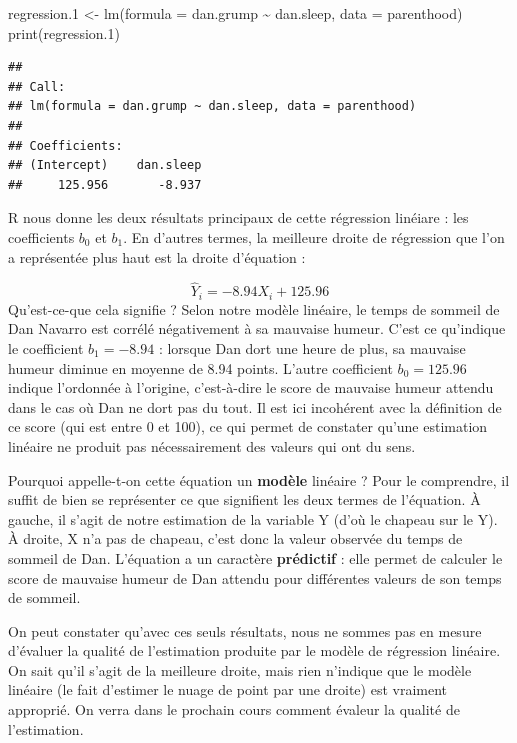 \documentclass[
  french,
]{book}
\newenvironment{Shaded}{\begin{snugshade}}{\end{snugshade}}
\newcommand{\AttributeTok}[1]{\textcolor[rgb]{0.77,0.63,0.00}{#1}}
\newcommand{\FloatTok}[1]{\textcolor[rgb]{0.00,0.00,0.81}{#1}}
\newcommand{\FunctionTok}[1]{\textcolor[rgb]{0.00,0.00,0.00}{#1}}
\newcommand{\NormalTok}[1]{#1}
\newcommand{\OtherTok}[1]{\textcolor[rgb]{0.56,0.35,0.01}{#1}}
\newcommand{\SpecialCharTok}[1]{\textcolor[rgb]{0.00,0.00,0.00}{#1}}
\begin{document}
\begin{Shaded}
\begin{Highlighting}[]
\NormalTok{regression}\FloatTok{.1} \OtherTok{\textless{}{-}} \FunctionTok{lm}\NormalTok{(}\AttributeTok{formula =}\NormalTok{ dan.grump }\SpecialCharTok{\textasciitilde{}}\NormalTok{ dan.sleep, }\AttributeTok{data =}\NormalTok{ parenthood)}
\FunctionTok{print}\NormalTok{(regression}\FloatTok{.1}\NormalTok{)}
\end{Highlighting}
\end{Shaded}

\begin{verbatim}
## 
## Call:
## lm(formula = dan.grump ~ dan.sleep, data = parenthood)
## 
## Coefficients:
## (Intercept)    dan.sleep  
##     125.956       -8.937
\end{verbatim}

R nous donne les deux résultats principaux de cette régression linéiare : les coefficients \(b_0\) et \(b_1\). En d'autres termes, la meilleure droite de régression que l'on a représentée plus haut est la droite d'équation :

\[ \hat{Y}_i = -8.94 X_i + 125.96 \]
Qu'est-ce-que cela signifie ? Selon notre modèle linéaire, le temps de sommeil de Dan Navarro est corrélé négativement à sa mauvaise humeur. C'est ce qu'indique le coefficient \(b_1 = -8.94\) : lorsque Dan dort une heure de plus, sa mauvaise humeur diminue en moyenne de 8.94 points. L'autre coefficient \(b_0 = 125.96\) indique l'ordonnée à l'origine, c'est-à-dire le score de mauvaise humeur attendu dans le cas où Dan ne dort pas du tout. Il est ici incohérent avec la définition de ce score (qui est entre 0 et 100), ce qui permet de constater qu'une estimation linéaire ne produit pas nécessairement des valeurs qui ont du sens.

Pourquoi appelle-t-on cette équation un \textbf{modèle} linéaire ? Pour le comprendre, il suffit de bien se représenter ce que signifient les deux termes de l'équation. À gauche, il s'agit de notre estimation de la variable Y (d'où le chapeau sur le Y). À droite, X n'a pas de chapeau, c'est donc la valeur observée du temps de sommeil de Dan. L'équation a un caractère \textbf{prédictif} : elle permet de calculer le score de mauvaise humeur de Dan attendu pour différentes valeurs de son temps de sommeil.

On peut constater qu'avec ces seuls résultats, nous ne sommes pas en mesure d'évaluer la qualité de l'estimation produite par le modèle de régression linéaire. On sait qu'il s'agit de la meilleure droite, mais rien n'indique que le modèle linéaire (le fait d'estimer le nuage de point par une droite) est vraiment approprié. On verra dans le prochain cours comment évaleur la qualité de l'estimation.
\end{document}
